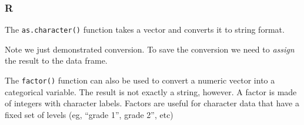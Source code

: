 \documentclass[
]{book}
\newenvironment{Shaded}{\begin{snugshade}}{\end{snugshade}}
\newcommand{\CommentTok}[1]{\textcolor[rgb]{0.56,0.35,0.01}{\textit{#1}}}
\newcommand{\DecValTok}[1]{\textcolor[rgb]{0.00,0.00,0.81}{#1}}
\newcommand{\ErrorTok}[1]{\textcolor[rgb]{0.64,0.00,0.00}{\textbf{#1}}}
\newcommand{\FunctionTok}[1]{\textcolor[rgb]{0.00,0.00,0.00}{#1}}
\newcommand{\NormalTok}[1]{#1}
\newcommand{\OtherTok}[1]{\textcolor[rgb]{0.56,0.35,0.01}{#1}}
\newcommand{\SpecialCharTok}[1]{\textcolor[rgb]{0.00,0.00,0.00}{#1}}
\newcommand{\StringTok}[1]{\textcolor[rgb]{0.31,0.60,0.02}{#1}}
\begin{document}
\hypertarget{r-18}{%
\subsubsection*{R}\label{r-18}}

The \texttt{as.character()} function takes a vector and converts it to string format.

\begin{Shaded}
\end{Shaded}

Note we just demonstrated conversion. To save the conversion we need to \emph{assign} the result to the data frame.

\begin{Shaded}
\end{Shaded}

The \texttt{factor()} function can also be used to convert a numeric vector into a categorical variable. The result is not exactly a string, however. A factor is made of integers with character labels. Factors are useful for character data that have a fixed set of levels (eg, ``grade 1'', grade 2'', etc)
\end{document}
